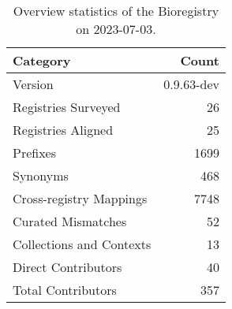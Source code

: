 \begin{table}
\caption{Overview statistics of the Bioregistry on 2023-07-03.}
\label{tab:bioregistry-summary}
\begin{tabular}{lr}
\toprule
Category & Count \\
\midrule
Version & 0.9.63-dev \\
Registries Surveyed & 26 \\
Registries Aligned & 25 \\
Prefixes & 1699 \\
Synonyms & 468 \\
Cross-registry Mappings & 7748 \\
Curated Mismatches & 52 \\
Collections and Contexts & 13 \\
Direct Contributors & 40 \\
Total Contributors & 357 \\
\bottomrule
\end{tabular}
\end{table}
